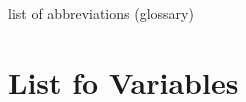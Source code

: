 \documentclass[
thesis.tex
]{subfiles}
\begin{document}
\newpage

	
	\listoffigures
	
	\thispagestyle{empty}

\newpage

	
	\listoftables
	
	\thispagestyle{empty}

\newpage


	list of abbreviations (glossary)

	\thispagestyle{empty}
	
\newpage

	
	\section*{List fo Variables}
	
	
	
	\thispagestyle{empty}
\end{document}

